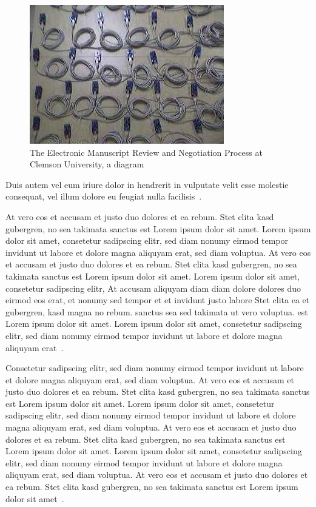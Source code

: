 \begin{figure}
\begin{center}
\includegraphics{testbed}
\caption[The Electronic Manuscript Review and Negotiation Process at \newline Clemson University, a diagram]{The Electronic Manuscript Review and Negotiation Process at Clemson University, a diagram}
\end{center}
\end{figure}

Duis autem vel eum iriure dolor in hendrerit in vulputate velit esse molestie
consequat, vel illum dolore eu feugiat nulla facilisis~\cite{de:mamnt}.

At vero eos et accusam et justo duo dolores et ea rebum. Stet clita kasd
gubergren, no sea takimata sanctus est Lorem ipsum dolor sit amet. Lorem ipsum
dolor sit amet, consetetur sadipscing elitr,  sed diam nonumy eirmod tempor
invidunt ut labore et dolore magna aliquyam erat, sed diam voluptua. At vero
eos et accusam et justo duo dolores et ea rebum. Stet clita kasd gubergren, no
sea takimata sanctus est Lorem ipsum dolor sit amet. Lorem ipsum dolor sit
amet, consetetur sadipscing elitr,  At accusam aliquyam diam diam dolore
dolores duo eirmod eos erat, et nonumy sed tempor et et invidunt justo labore
Stet clita ea et gubergren, kasd magna no rebum. sanctus sea sed takimata ut
vero voluptua. est Lorem ipsum dolor sit amet. Lorem ipsum dolor sit amet,
consetetur sadipscing elitr,  sed diam nonumy eirmod tempor invidunt ut labore
et dolore magna aliquyam erat~\cite{dool:wsfwm}.

Consetetur sadipscing elitr,  sed diam nonumy eirmod tempor invidunt ut labore
et dolore magna aliquyam erat, sed diam voluptua. At vero eos et accusam et
justo duo dolores et ea rebum. Stet clita kasd gubergren, no sea takimata
sanctus est Lorem ipsum dolor sit amet. Lorem ipsum dolor sit amet, consetetur
sadipscing elitr,  sed diam nonumy eirmod tempor invidunt ut labore et dolore
magna aliquyam erat, sed diam voluptua. At vero eos et accusam et justo duo
dolores et ea rebum. Stet clita kasd gubergren, no sea takimata sanctus est
Lorem ipsum dolor sit amet. Lorem ipsum dolor sit amet, consetetur sadipscing
elitr,  sed diam nonumy eirmod tempor invidunt ut labore et dolore magna
aliquyam erat, sed diam voluptua. At vero eos et accusam et justo duo dolores
et ea rebum. Stet clita kasd gubergren, no sea takimata sanctus est Lorem ipsum
dolor sit amet~\cite{dutt:tesas}.

